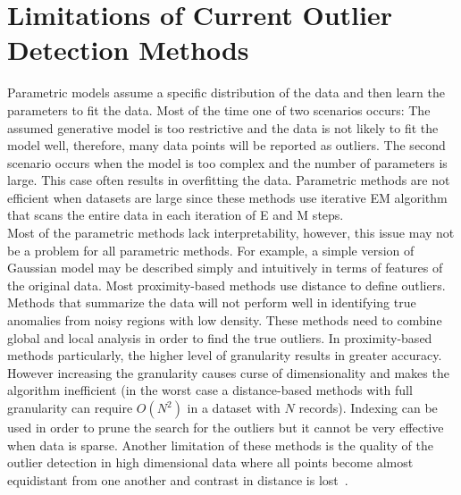 \section{Limitations of Current Outlier Detection Methods}\label{sec:limitaion}
Parametric models assume a specific distribution of the data and then learn the parameters to fit the data. Most of the time one of two scenarios occurs: The assumed generative model is too restrictive and the data is not likely to fit the model well, therefore, many data points will be reported as outliers. The second scenario occurs when the model is too complex and the number of parameters is large. This case often results in overfitting the data. 
Parametric methods are not efficient when datasets are large since these methods use iterative EM algorithm that scans the entire data in each iteration of E and M steps. 
\\
Most of the parametric methods lack interpretability, however, this issue may not be a problem for all parametric methods. For example, a simple version of Gaussian model may be described simply and intuitively in terms of features of the original data.
Most proximity-based methods use distance to define outliers. Methods that summarize the data will not perform well in identifying true anomalies from noisy regions with low density. These methods need to combine global and local analysis in order to find the true outliers. 
In proximity-based methods particularly, the higher level of granularity results in greater accuracy. However increasing the granularity causes curse of dimensionality and makes the algorithm inefficient (in the worst case a distance-based methods with full granularity can require $O(N^2)$ in a dataset with $N$ records). Indexing can be used in order to prune the search for the outliers but it cannot be very effective when data is sparse. 
Another limitation of these methods is the quality of the outlier detection in high dimensional data where all points become almost equidistant from one another and contrast in distance is lost~\cite{Hinneburg2000}.